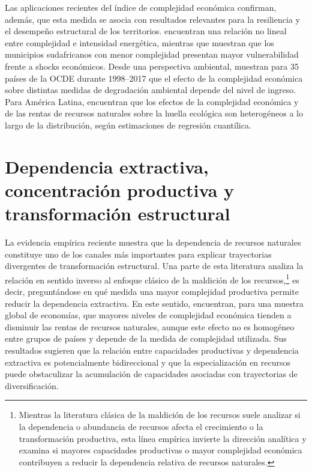 \documentclass[../../PTFM.tex]{subfiles}
\begin{document}
	Las aplicaciones recientes del índice de complejidad económica confirman, además, que esta medida se asocia con resultados relevantes para la resiliencia y el desempeño estructural de los territorios. \textcite{Kazemzadeh2023} encuentran una relación no lineal entre complejidad e intensidad energética, mientras que \textcite{Rossouw2023} muestran que los municipios sudafricanos con menor complejidad presentan mayor vulnerabilidad frente a shocks económicos. Desde una perspectiva ambiental, \textcite{Aluko2023} muestran para 35 países de la OCDE durante 1998--2017 que el efecto de la complejidad económica sobre distintas medidas de degradación ambiental depende del nivel de ingreso. Para América Latina, \textcite{Alvarado2021} encuentran que los efectos de la complejidad económica y de las rentas de recursos naturales sobre la huella ecológica son heterogéneos a lo largo de la distribución, según estimaciones de regresión cuantílica.

	\section{Dependencia extractiva, concentración productiva y transformación estructural}
	\label{sec:dependencia-concentracion-transformacion}
	
	La evidencia empírica reciente muestra que la dependencia de recursos naturales constituye uno de los canales más importantes para explicar trayectorias divergentes de transformación estructural. Una parte de esta literatura analiza la relación en sentido inverso al enfoque clásico de la maldición de los recursos,\footnote{Mientras la literatura clásica de la maldición de los recursos suele analizar si la dependencia o abundancia de recursos afecta el crecimiento o la transformación productiva, esta línea empírica invierte la dirección analítica y examina si mayores capacidades productivas o mayor complejidad económica contribuyen a reducir la dependencia relativa de recursos naturales.} es decir, preguntándose en qué medida una mayor complejidad productiva permite reducir la dependencia extractiva. En este sentido, \textcite{Canh2020} encuentran, para una muestra global de economías, que mayores niveles de complejidad económica tienden a disminuir las rentas de recursos naturales, aunque este efecto no es homogéneo entre grupos de países y depende de la medida de complejidad utilizada. Sus resultados sugieren que la relación entre capacidades productivas y dependencia extractiva es potencialmente bidireccional y que la especialización en recursos puede obstaculizar la acumulación de capacidades asociadas con trayectorias de diversificación.
\end{document}
